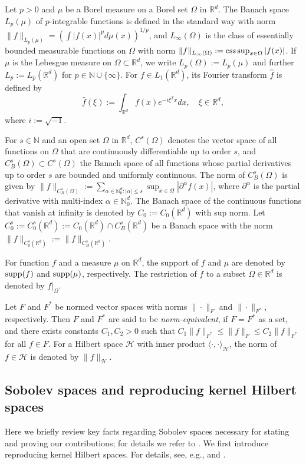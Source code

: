 \documentclass[11pt]{article}
\theoremstyle{remark}
\theoremstyle{example}
\theoremstyle{remark}
\newcommand{\cd}{\cdot}
\renewcommand{\H}{{\mathcal{H}}}
\newcommand{\N}{\mathbb{N}}
\newcommand{\R}{\mathbb{R}}
\begin{document}
Let $p>0$ and $\mu$ be a Borel measure on a Borel set $\Omega$ in $\R^d$.   
The Banach space $L_p(\mu)$ of $p$-integrable functions is defined in the standard way with norm $\| f \|_{L_p(\mu)} = (\int |f(x)|^p d\mu(x))^{1/p}$, and $L_\infty(\Omega)$ is the class of essentially bounded measurable functions on $\Omega$ with norm $\| f \|_{L_\infty(\Omega)} := {\rm ess}\sup_{x \in \Omega} |f(x)|$.
If $\mu$ is the Lebesgue measure on $\Omega \subset \R^d$, we write $L_p(\Omega) := L_p(\mu)$ and further $L_p := L_p(\R^d)$ for $p \in \N \cup \{ \infty \}$.
For $f \in L_1(\R^d)$, its Fourier transform $\hat{f}$ is defined by 
\[ 
\hat{f}(\xi) := \int_{\R^d} f(x) e^{- i \xi^T x} dx, \quad \xi \in \R^d,
\]
where $i := \sqrt{-1}$. 

For $s \in \N$ and an open set $\Omega$ in $\R^d$, $C^s(\Omega)$ denotes the vector space of all functions on $\Omega$ that are continuously differentiable up to order $s$, and  
$C_B^s(\Omega) \subset C^s(\Omega)$ the Banach space of all functions whose partial derivatives up to order $s$ are bounded and uniformly continuous. 
The norm of $C_B^s(\Omega)$ is given by $\| f \|_{C_B^s(\Omega)} := \sum_{\alpha \in \N_0^d: | \alpha | \leq s} \sup_{x \in \Omega} |\partial^\alpha f (x)| $, where $\partial^\alpha$ is the partial derivative with multi-index $\alpha \in \N_0^d$.
The Banach space of the continuous functions that vanish at infinity is denoted by $C_0 := C_0(\R^d)$ with sup norm. Let $C_0^s := C_0^s(\R^d) := C_0(\R^d) \cap C_B^s(\R^d)$ be a Banach space with 
the norm $\| f \|_{C_0^s(\R^d)} := \| f \|_{C_B^s(\R^d)}$.

For function $f$ and a measure $\mu$ on $\R^d$, the support of $f$ and $\mu$ are denoted by ${\rm supp}(f)$ and ${\rm supp} (\mu)$, respectively. The restriction of $f$ to a subset $\Omega\in\R^d$ is denoted by $f|_\Omega$.


Let $F$ and $F^*$ be normed vector spaces with norms $\| \cd \|_F$ and $\| \cd \|_{F^*}$, respectively. 
Then $F$ and $F^*$ are said to be {\em norm-equivalent}, if 
$F= F^*$ as a set, and there exists constants $C_1, C_2 > 0$ such that $C_1 \| f \|_{F^*} \leq \| f \|_{F} \leq C_2 \| f \|_{F^*}$ for all $f \in F$.
For a Hilbert space $\H$ with inner product $\langle\cdot,\cdot\rangle_\H$, the norm of $f\in\H$ is denoted by $\|f\|_\H$.  


\subsection{Sobolev spaces and reproducing kernel Hilbert spaces} \label{sec:sobolev_pre}
Here we briefly review key facts regarding Sobolev spaces necessary for stating and proving our contributions; for details we refer to \cite{AdaFou03,Tri06,BreSco08}.
We first introduce reproducing kernel Hilbert spaces. For details, see, e.g., \cite[Section 4]{SteChr2008} and \cite[Section 10]{Wen05}.
\end{document}
